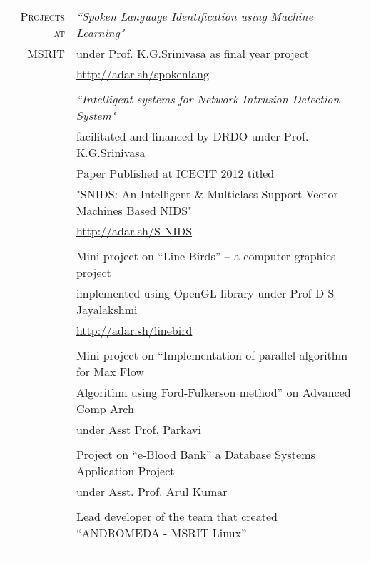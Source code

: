 \documentclass[a4paper,10pt]{article} %
\begin{document}
\begin{tabular}{rl}
\textsc{Projects at} & \textit{“Spoken Language Identification using Machine Learning"}\\ 
\textsc{MSRIT} & under Prof. K.G.Srinivasa as final year project\\
& \href{http://adar.sh/spokenlang}{http://adar.sh/spokenlang}\\
& \\
& \textit{“Intelligent systems for Network Intrusion Detection System"} \\ 
& facilitated and financed by DRDO under Prof. K.G.Srinivasa\\
& Paper Published at ICECIT 2012 titled \\
& "SNIDS: An Intelligent \& Multiclass Support Vector Machines Based NIDS" \\
& \href{http://adar.sh/S-NIDS}{http://adar.sh/S-NIDS} \\
& \\
& Mini project on “Line Birds” – a computer graphics project \\
& implemented using OpenGL library under Prof D S Jayalakshmi \\
& \href{http://adar.sh/linebird}{http://adar.sh/linebird}\\
& \\
& Mini project on “Implementation of parallel algorithm for Max Flow \\
& Algorithm using Ford-Fulkerson method” on Advanced Comp Arch \\
& under Asst Prof. Parkavi \\
& \\
& Project on “e-Blood Bank” a Database Systems Application Project \\
& under Asst. Prof. Arul Kumar \\
& \\
& Lead developer of the team that created “ANDROMEDA - MSRIT Linux” \\
& \\
& \\
& \\
\end{tabular}

\end{document}
